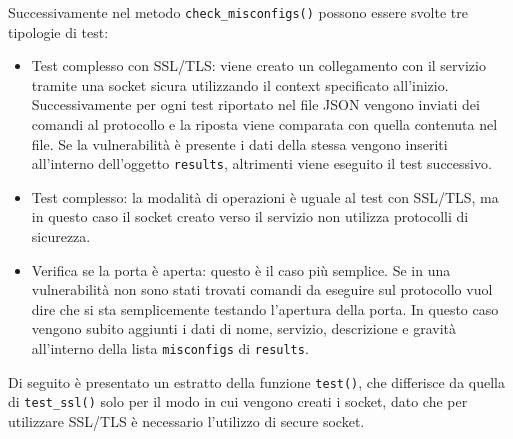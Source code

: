 \documentclass[12pt]{report}
\begin{document}
Successivamente nel metodo \lstinline{check_misconfigs()} possono essere svolte tre tipologie di test:

\begin{itemize}
    \item Test complesso con SSL/TLS: viene creato un collegamento con il servizio tramite una socket sicura utilizzando il context specificato all'inizio. Successivamente per ogni test riportato nel file JSON vengono inviati dei comandi al protocollo e la riposta viene comparata con quella contenuta nel file. Se la vulnerabilità è presente i dati della stessa vengono inseriti all'interno dell'oggetto \lstinline{results}, altrimenti viene eseguito il test successivo.
    \item Test complesso: la modalità di operazioni è uguale al test con SSL/TLS, ma in questo caso il socket creato verso il servizio non utilizza protocolli di sicurezza.
    \item Verifica se la porta è aperta: questo è il caso più semplice. Se in una vulnerabilità non sono stati trovati comandi da eseguire sul protocollo vuol dire che si sta semplicemente testando l'apertura della porta. In questo caso vengono subito aggiunti i dati di nome, servizio, descrizione e gravità all'interno della lista \lstinline{misconfigs} di \lstinline{results}.
\end{itemize}

Di seguito è presentato un estratto della funzione \lstinline{test()}, che differisce da quella di \lstinline{test_ssl()} solo per il modo in cui vengono creati i socket, dato che per utilizzare SSL/TLS è necessario l'utilizzo di secure socket.
\end{document}
